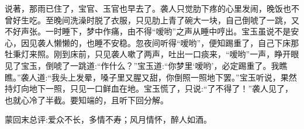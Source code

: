 \begin{parag}
    说著，那雨已住了，宝官、玉官也早去了。袭人只觉肋下疼的心里发闹，晚饭也不曾好生吃。至晚间洗澡时脱了衣服，只见肋上青了碗大一块，自己倒唬了一跳，又不好声张。一时睡下，梦中作痛，由不得“嗳哟”之声从睡中哼出。宝玉虽说不是安心，因见袭人懒懒的，也睡不安稳。忽夜间听得“嗳哟”，便知踢重了，自己下床那牡秉灯来照。刚到床前，只见袭人嗽了两声，吐出一口痰来，“嗳哟”一声，睁开眼见了宝玉，倒唬了一跳道:“作什么？”宝玉道:“你梦里‘嗳哟’，必定踢重了。我瞧瞧。”袭人道:“我头上发晕，嗓子里又腥又甜，你倒照一照地下罢。”宝玉听说，果然持灯向地下一照，只见一口鲜血在地。宝玉慌了，只说:“了不得了！”袭人见了，也就心冷了半截。要知端的，且听下回分解。
\end{parag}


\begin{parag}
    \begin{note}蒙回末总评:爱众不长，多情不寿；风月情怀，醉人如酒。\end{note}
\end{parag}